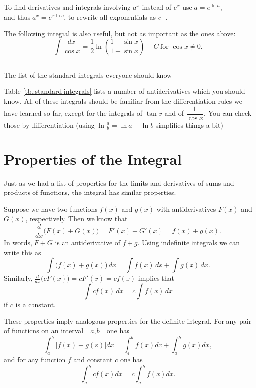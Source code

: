 \begin{table}[hb]
  To find derivatives and integrals involving $a^x$ instead of $e^x$ use
  $a = e^{\ln a}$,\\
  and thus $a^{x} = e^{x\ln a}$, to rewrite all exponentials as $e^{\ldots}$.
  \smallskip

  The following integral is also useful, but not as important as the
  ones above:
  \[
  \int \frac{ d x}{\cos x} = \frac12 \ln\left(\frac{1+\sin x}{1-\sin x}\right) +C
  \text{ for }\cos x\neq 0.
  \]
  \rule[1pt]{\textwidth}{2pt}
  \caption{The list of the standard integrals everyone should know}
  \label{tbl:standard-integrals}
\end{table}

Table \ref{tbl:standard-integrals} lists a number of antiderivatives which you
should know.  All of these integrals should be familiar from the
differentiation rules we have learned so far, except for the integrals of
$\tan x$ and of $\dfrac1{\cos x}$.  You can check those by differentiation
(using $\ln\frac ab=\ln a-\ln b$ simplifies things a bit).


\section{Properties of the Integral} %
Just as we had a list of properties for the limits and derivatives of
sums and products of functions, the integral has similar properties.

Suppose we have two functions $f(x)$ and $g(x)$ with antiderivatives
$F(x)$ and $G(x)$, respectively.  Then we know that
\[
\frac{d}{dx}\bigl(F(x) + G(x)\bigr) = F'(x) + G'(x) = f(x) + g(x).
\]
In words, $F+G$ is an antiderivative of $f+g$.  Using indefinite
integrals we can write this as
\begin{equation}
  \label{eq:sum-of-antiderivs}
  \int\bigl( f(x) + g(x) \bigr)\, dx =
  \int f(x) \, dx +\int g(x) \, dx.
\end{equation}
Similarly, $\frac{d}{dx}\bigl(cF(x)\bigr) = cF'(x) = cf(x)$ implies
that
\begin{equation}
  \label{eq:constant-times-antideriv}
  \int cf(x) \, dx = c\int f(x) \, dx
\end{equation}
if $c$ is a constant.


These properties imply analogous properties for the definite integral.
For any pair of functions on an interval $[a, b]$ one has
\begin{equation}
  \label{eq:integral-additive}
  \int_a^b\bigl[f(x) + g(x) \bigr] dx = 
  \int_a^b f(x) dx + \int_a^bg(x) dx,
\end{equation}
and for any function $f$ and constant $c$ one has
\begin{equation}
  \label{eq:integral-homogeneous}
  \int_a^b cf(x) dx = c\int_a^bf(x)dx.
\end{equation}

